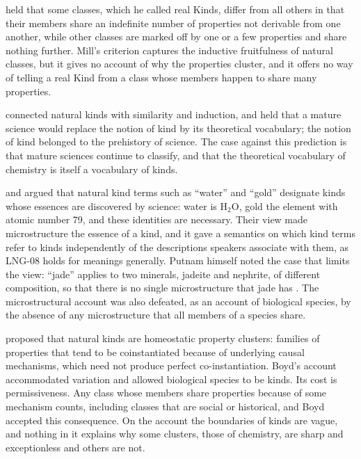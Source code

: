 \documentclass{situationist-preprint}
\begin{document}
\citet[I.vii.4]{Mill1843} held that some classes, which he called real Kinds, differ from all others in that their members share an indefinite number of properties not derivable from one another, while other classes are marked off by one or a few properties and share nothing further. Mill's criterion captures the inductive fruitfulness of natural classes, but it gives no account of why the properties cluster, and it offers no way of telling a real Kind from a class whose members happen to share many properties.

\citet{Quine1969} connected natural kinds with similarity and induction, and held that a mature science would replace the notion of kind by its theoretical vocabulary; the notion of kind belonged to the prehistory of science. The case against this prediction is that mature sciences continue to classify, and that the theoretical vocabulary of chemistry is itself a vocabulary of kinds.

\citet{Kripke1980} and \citet{Putnam1975} argued that natural kind terms such as \enquote{water} and \enquote{gold} designate kinds whose essences are discovered by science: water is H$_2$O, gold the element with atomic number 79, and these identities are necessary. Their view made microstructure the essence of a kind, and it gave a semantics on which kind terms refer to kinds independently of the descriptions speakers associate with them, as LNG-08 holds for meanings generally. Putnam himself noted the case that limits the view: \enquote{jade} applies to two minerals, jadeite and nephrite, of different composition, so that there is no single microstructure that jade has \citep{Putnam1975,LaPorte2004}. The microstructural account was also defeated, as an account of biological species, by the absence of any microstructure that all members of a species share.

\citet{Boyd1991,Boyd1999} proposed that natural kinds are homeostatic property clusters: families of properties that tend to be coinstantiated because of underlying causal mechanisms, which need not produce perfect co-instantiation. Boyd's account accommodated variation and allowed biological species to be kinds. Its cost is permissiveness. Any class whose members share properties because of some mechanism counts, including classes that are social or historical, and Boyd accepted this consequence. On the account the boundaries of kinds are vague, and nothing in it explains why some clusters, those of chemistry, are sharp and exceptionless and others are not.
\end{document}
